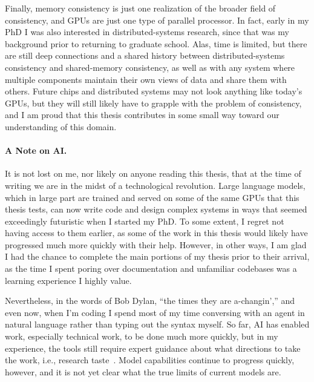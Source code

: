 Finally, memory consistency is just one realization of the broader field of consistency, and GPUs are just one type of parallel processor. In fact, early in my PhD I was also interested in distributed-systems research, since that was my background prior to returning to graduate school. Alas, time is limited, but there are still deep connections and a shared history between distributed-systems consistency and shared-memory consistency, as well as with any system where multiple components maintain their own views of data and share them with others. Future chips and distributed systems may not look anything like today's GPUs, but they will still likely have to grapple with the problem of consistency, and I am proud that this thesis contributes in some small way toward our understanding of this domain.

\paragraph{A Note on AI.} It is not lost on me, nor likely on anyone reading this thesis, that at the time of writing we are in the midst of a technological revolution. Large language models, which in large part are trained and served on some of the same GPUs that this thesis tests, can now write code and design complex systems in ways that seemed exceedingly futuristic when I started my PhD. To some extent, I regret not having access to them earlier, as some of the work in this thesis would likely have progressed much more quickly with their help. However, in other ways, I am glad I had the chance to complete the main portions of my thesis prior to their arrival, as the time I spent poring over documentation and unfamiliar codebases was a learning experience I highly value.

Nevertheless, in the words of Bob Dylan, ``the times they are a-changin','' and even now, when I'm coding I spend most of my time conversing with an agent in natural language rather than typing out the syntax myself. So far, AI has enabled work, especially technical work, to be done much more quickly, but in my experience, the tools still require expert guidance about what directions to take the work, i.e., research taste~\cite{olah_research_taste}. Model capabilities continue to progress quickly, however, and it is not yet clear what the true limits of current models are.


